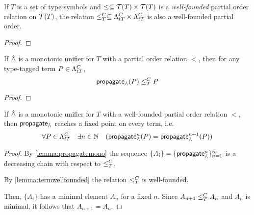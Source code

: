 \documentclass[main.tex]{subfiles}
\begin{document}
\begin{lemma}\label{lemma:termwellfounded}
    If $T$ is a set of type symbols and $\less \subseteq \tclos{T} \times \tclos{T}$
    is a \emph{well-founded} partial order relation on $\tclos{T}$, the relation
    $\termless{T}{C} \subseteq \ttlambda{T}{C} \times \ttlambda{T}{C}$
    is also a well-founded partial order.
\end{lemma}
\begin{proof}
\end{proof}

\begin{lemma}\label{lemma:propagatemono}
    If $\unify$ is a monotonic unifier for $T$ with a
    partial order relation $\less$, then for any type-tagged term
    $P \in \ttlambda{T}{C}$, \[ \mcf{propagate}_{\unify}(P) \termless{T}{C} P \]
\end{lemma}
\begin{proof}
\end{proof}

\begin{prop}\label{prop:propagateterminates}
    If $\unify$ is a monotonic unifier for $T$ with a well-founded
    partial order relation $\less$, then
    $\mcf{propagate}_{\unify}$ reaches a fixed point on every term, i.e.
    \[ \forall P \in \ttlambda{T}{C} \quad \exists n \in \mathbb{N} \quad
        (\mcf{propagate}_{\unify}^n(P) = \mcf{propagate}_{\unify}^{n + 1}(P)) \]
\end{prop}
\begin{proof}
    By \cref{lemma:propagatemono} the sequence
    $\{ A_i \} = \{ \mcf{propagate}_{\unify}^{n} \}_{n = 1}^{\infty}$
    is a decreasing chain with respect to $\termless{T}{C}$.

    By \cref{lemma:termwellfounded} the relation $\termless{T}{C}$ is well-founded.

    Then, $\{ A_i \}$ has a minimal element $A_n$ for a fixed $n$. Since
    $A_{n + 1} \termless{T}{C} A_n$ and $A_n$ is minimal, it follows that
    $A_{n + 1} = A_n$.
\end{proof}

  \newpage
\end{document}
